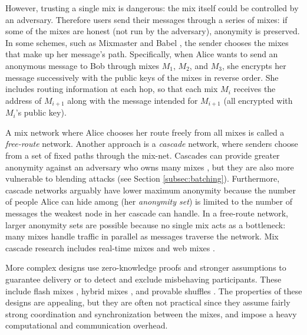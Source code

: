 \documentclass[11pt]{IEEEtran}
\begin{document}
However, trusting a single mix is dangerous: the mix itself could be
controlled by an adversary. Therefore users send their messages through
a series of mixes: if some of the mixes are honest (not run by the adversary),
anonymity is preserved. In some schemes, such as Mixmaster
\cite{mixmaster-spec} and Babel \cite{babel}, the sender chooses the
mixes that make up her message's path. Specifically, when Alice
wants to send an anonymous message to Bob through mixes $M_1$, $M_2$,
and $M_3$, she encrypts her message successively with the public keys of
the mixes in reverse order. She includes routing information at each hop,
so that each mix $M_i$ receives the address of $M_{i+1}$ along with the
message intended for $M_{i+1}$ (all encrypted with $M_i$'s public key).

A mix network where Alice chooses her route freely from all mixes is
called a \emph{free-route} network. Another approach is a \emph{cascade}
network, where senders choose from a set of fixed paths through the
mix-net. Cascades can provide greater anonymity against an adversary
who owns many mixes \cite{disad-free-routes}, but they are also more
vulnerable to blending attacks \cite{batching-taxonomy} (see Section
\ref{subsec:batching}).
Furthermore, cascade networks arguably have lower maximum anonymity because
the number of people Alice can hide among (her \emph{anonymity set}) is limited
to the number of messages the weakest node in her cascade can handle.
In a free-route network, larger anonymity sets are possible because no
single mix acts as a bottleneck: many mixes handle traffic in parallel as
messages traverse the network.
Mix cascade research includes real-time
mixes \cite{realtime-mix} and web mixes \cite{web-mix}.

More complex designs use zero-knowledge proofs and stronger assumptions
to guarantee delivery or to detect and exclude misbehaving participants.
These include flash mixes \cite{flash-mix},
hybrid mixes \cite{jakobsson-optimally}\cite{hybrid-mix},
and provable shuffles \cite{PShuffle}\cite{shuffle}. The properties
of these designs are appealing, but they are often not practical since
they assume fairly strong coordination and synchronization between the mixes,
and impose a heavy computational and communication overhead.
\end{document}
